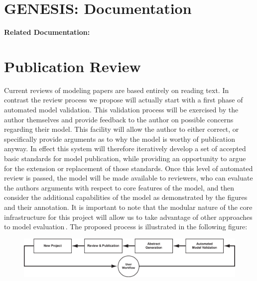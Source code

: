\documentclass[12pt]{article}
\begin{document}
\section*{GENESIS: Documentation}

{\bf Related Documentation:}

\section*{Publication Review}

Current reviews of modeling papers are based entirely on reading text. In contrast the review process we propose will actually start with a first phase of automated model validation.  This validation process will be exercised by the author themselves and provide feedback to the author on possible concerns regarding their model.  This facility will allow the author to either correct, or specifically provide arguments as to why the model is worthy of publication anyway.  In effect this system will therefore iteratively develop a set of accepted basic standards for model publication, while providing an opportunity to argue for the extension or replacement of those standards.  Once this level of automated review is passed, the model will be made available to reviewers, who can evaluate the authors arguments with respect to core features of the model, and then consider the additional capabilities of the model as demonstrated by the figures and their annotation.  It is important to note that the modular nature of the core infrastructure for this project will allow us to take advantage of other approaches to model evaluation\,\cite{Cannon:2006pi}. The proposed process is illustrated in the following figure:  

\begin{figure}[h]
  \centering
   \includegraphics[scale=0.5]{figures/publication-workflow.eps}
  \label{fig:pub-wflow}
\end{figure}
\end{document}
